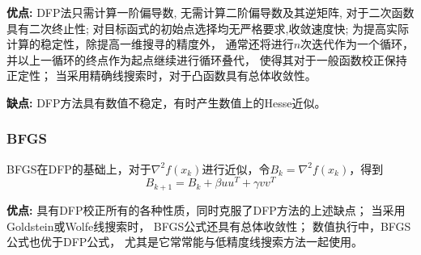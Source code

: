                 \textbf{优点:}
                    DFP法只需计算一阶偏导数,
                    无需计算二阶偏导数及其逆矩阵,
                    对于二次函数具有二次终止性;
                    对目标函式的初始点选择均无严格要求,收敛速度快;
                    为提高实际计算的稳定性，除提高一维搜寻的精度外，
                    通常还将进行$n$次迭代作为一个循环，
                    并以上一循环的终点作为起点继续进行循环叠代，
                    使得其对于一般函数校正保持正定性；
                    当采用精确线搜索时，对于凸函数具有总体收敛性。
                
                \textbf{缺点:}
                    DFP方法具有数值不稳定，有时产生数值上的Hesse近似。
                    
            \subsubsection{BFGS}\cite{1989On}
                BFGS在DFP的基础上，对于$\nabla^2f(x_k)$进行近似，令$B_k=\nabla^2f(x_k)$，得到
                \begin{equation}
                    B_{k+1} = B_k + \beta uu^T + \gamma vv^T
                \end{equation}
                
                \textbf{优点:}
                    具有DFP校正所有的各种性质，同时克服了DFP方法的上述缺点；
                    当采用Goldstein或Wolfe线搜索时，
                    BFGS公式还具有总体收敛性；
                    数值执行中，BFGS公式也优于DFP公式，
                    尤其是它常常能与低精度线搜索方法一起使用。
                        
            
            
